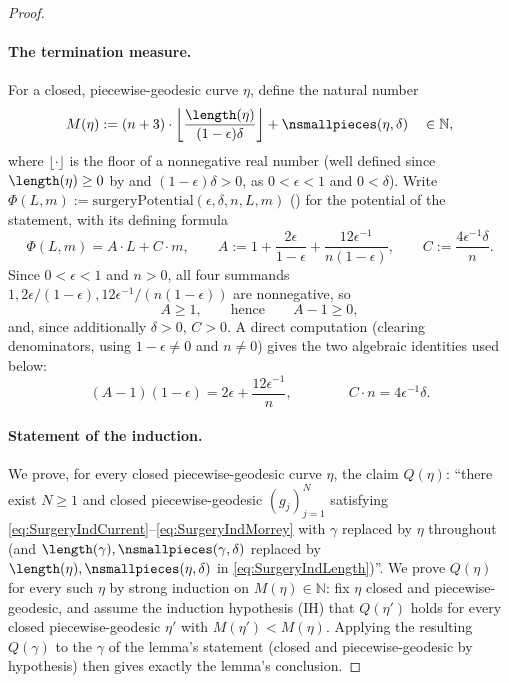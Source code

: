 \begin{proof}
  \paragraph{The termination measure.} For a closed, piecewise-geodesic curve $\eta$, define the
  natural number
  \[
    M(\eta) := (n+3) \cdot \left\lfloor \frac{\length(\eta)}{(1-\epsilon)\delta} \right\rfloor +
    \nsmallpieces(\eta,\delta)
    \quad \in \mathbb{N}
    ,
  \]
  where $\lfloor\cdot\rfloor$ is the floor of a nonnegative real number (well defined since
  $\length(\eta)\ge0$ by  and $(1-\epsilon)\delta>0$, as $0<\epsilon<1$ and
  $0<\delta$). Write $\Phi(L,m) := \mathrm{surgeryPotential}(\epsilon,\delta,n,L,m)$
  () for the potential of the statement, with its defining formula
  \[
    \Phi(L,m) = A \cdot L + C \cdot m
    , \qquad
    A := 1 + \frac{2\epsilon}{1-\epsilon} + \frac{12\epsilon^{-1}}{n(1-\epsilon)}
    , \qquad
    C := \frac{4\epsilon^{-1}\delta}{n}
    .
  \]
  Since $0<\epsilon<1$ and $n>0$, all four summands $1,2\epsilon/(1-\epsilon),
  12\epsilon^{-1}/(n(1-\epsilon))$ are nonnegative, so
  \begin{equation}
    \label{eq:A-ge-one}
    A \ge 1
    , \qquad\text{hence}\qquad A - 1 \ge 0
    ,
  \end{equation}
  and, since additionally $\delta>0$, $C>0$. A direct computation (clearing denominators, using
  $1-\epsilon\ne0$ and $n\ne0$) gives the two algebraic identities used below:
  \begin{equation}
    \label{eq:A-minus-one-identity}
    (A-1)(1-\epsilon) = 2\epsilon + \frac{12\epsilon^{-1}}{n}
    , \qquad\qquad
    C \cdot n = 4\epsilon^{-1}\delta
    .
  \end{equation}

  \paragraph{Statement of the induction.} We prove, for every closed piecewise-geodesic curve
  $\eta$, the claim $Q(\eta)$: ``there exist $N\ge1$ and closed piecewise-geodesic $(g_j)_{j=1}^N$
  satisfying \eqref{eq:SurgeryIndCurrent}--\eqref{eq:SurgeryIndMorrey} with $\gamma$ replaced by
  $\eta$ throughout (and $\length(\gamma),\nsmallpieces(\gamma,\delta)$ replaced by
  $\length(\eta),\nsmallpieces(\eta,\delta)$ in \eqref{eq:SurgeryIndLength})''. We prove $Q(\eta)$
  for every such $\eta$ by strong induction on $M(\eta) \in \mathbb{N}$: fix $\eta$ closed and
  piecewise-geodesic, and assume the induction hypothesis (IH) that $Q(\eta')$ holds for every
  closed piecewise-geodesic $\eta'$ with $M(\eta') < M(\eta)$. Applying the resulting $Q(\gamma)$
  to the $\gamma$ of the lemma's statement (closed and piecewise-geodesic by hypothesis) then gives
  exactly the lemma's conclusion.


\end{proof}
